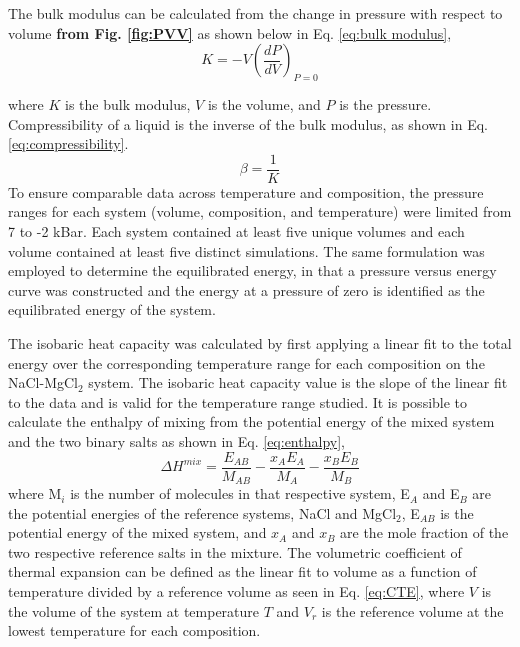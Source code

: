 \documentclass[review]{elsarticle}
\providecommand{\DIFaddtex}[1]{{\bf #1}} %
\providecommand{\DIFaddbegin}{\protect\color{blue}} %
\providecommand{\DIFaddend}{\protect\color{black}} %
\providecommand{\DIFadd}[1]{\texorpdfstring{\DIFaddtex{#1}}{#1}} %
\newcommand{\DIFaddincludegraphics}[2][]{{\color{blue}\fbox{\DIFOincludegraphics[#1]{#2}}}} %
\DeclareRobustCommand{\DIFaddbegin}{\DIFOaddbegin \let\includegraphics\DIFaddincludegraphics} %
\DeclareRobustCommand{\DIFaddend}{\DIFOaddend \let\includegraphics\DIFOincludegraphics} %
\begin{document}
\DIFaddend The bulk modulus can be calculated from the change in pressure with respect to volume \DIFaddbegin \DIFadd{from Fig. \ref{fig:PVV} }\DIFaddend as shown below in Eq. \ref{eq:bulk modulus},
\begin{equation}
\label{eq:bulk modulus}
K = -V {(\frac{dP}{dV})}_{P=0}
\end{equation}
\DIFaddbegin 

\noindent \DIFaddend where $K$ is the bulk modulus, $V$ is the volume, and $P$ is the pressure.  Compressibility of a liquid is the inverse of the bulk modulus, as shown in Eq. \ref{eq:compressibility}. 
\begin{equation}
\label{eq:compressibility}
\beta = \frac{1}{K}
\end{equation}
To ensure comparable data across temperature and composition, the pressure ranges for each system (volume, composition, and temperature) were limited from 7 to -2 kBar. Each system contained at least five unique volumes and each volume contained at least five distinct simulations. The same formulation was employed to determine the equilibrated energy, in that a pressure versus energy curve was constructed and the energy at a pressure of zero is identified as the equilibrated energy of the system. 


The isobaric heat capacity was calculated by first applying a linear fit to the total energy over the corresponding temperature range for each composition on the NaCl-MgCl$_2$ system. The isobaric heat capacity value is the slope of the linear fit to the data and is valid for the temperature range studied. It is possible to calculate the enthalpy of mixing from the potential energy of the mixed system and the two binary salts as shown in Eq. \ref{eq:enthalpy},
\begin{equation}
 \label{eq:enthalpy}
 \Delta H^{mix} = \frac{E_{AB}}{M_{AB}} - \frac{x_A E_A}{M_A} - \frac{x_B E_B}{M_B}
\end{equation}
where M$_i$ is the number of molecules in that respective system, E$_A$ and E$_B$ are the potential energies of the reference systems, NaCl and MgCl$_2$, E$_{AB}$ is the potential energy of the mixed system, and $x_A$ and $x_B$ are the mole fraction of the two respective reference salts in the mixture. The volumetric coefficient of thermal expansion can be defined as the linear fit to volume as a function of temperature divided by a reference volume as seen in Eq. \ref{eq:CTE}, where $V$ is the volume of the system at temperature $T$ and $V_r$ is the reference volume at the lowest temperature for each composition.
\end{document}
